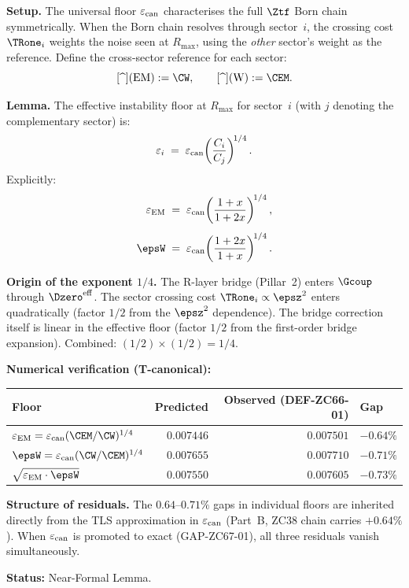\documentclass[12pt, a4paper]{article}
\renewcommand{\epsEM}{\varepsilon_{\rm EM}}
\renewcommand{\epscan}{\varepsilon_{\rm can}}
\begin{document}
\begin{formalbox}[title={LEM-ZC67-01: Sector Weight Projection ---
  $\varepsilon_i = \varepsilon_{\rm can}(C_i/C_j)^{1/4}$,\,$j\neq i$
  (Near-Formal)}]

\textbf{Setup.}
The universal floor $\epscan$ characterises the full $\Ztf$ Born
chain symmetrically.
When the Born chain resolves through sector~$i$, the crossing
cost $\TRone_i$ weights the noise seen at $R_{\max}$,
using the \emph{other} sector's weight as the reference.
Define the cross-sector reference for each sector:
\begin{equation}
  \Cref^{(\rm EM)} := \CW,
  \qquad
  \Cref^{(\rm W)}  := \CEM.
  \label{eq:Cref}
\end{equation}

\textbf{Lemma.}
The effective instability floor at $R_{\max}$ for sector~$i$
(with $j$ denoting the complementary sector) is:
\begin{equation}
  \varepsilon_i
  \;=\;
  \epscan\!\left(\frac{C_i}{C_j}\right)^{\!1/4}.
  \label{eq:proj}
\end{equation}
Explicitly:
\begin{align}
  \epsEM &\;=\; \epscan\!\left(\frac{1+x}{1+2x}\right)^{\!1/4},
  \label{eq:epsEM-pred}\\[4pt]
  \epsW  &\;=\; \epscan\!\left(\frac{1+2x}{1+x}\right)^{\!1/4}.
  \label{eq:epsW-pred}
\end{align}

\textbf{Origin of the exponent $1/4$.}
The R-layer bridge (Pillar~2) enters $\Gcoup$ through
$\Dzero^{\rm eff}$.
The sector crossing cost $\TRone_i \propto \epsz^{2}$ enters
quadratically (factor $1/2$ from the $\epsz^{2}$ dependence).
The bridge correction itself is linear in the effective floor
(factor $1/2$ from the first-order bridge expansion).
Combined: $(1/2)\times(1/2) = 1/4$.

\textbf{Numerical verification (T-canonical):}
\begin{center}
\renewcommand{\arraystretch}{1.25}
\begin{tabular}{@{}lrrl@{}}
\toprule
Floor & Predicted & Observed (DEF-ZC66-01) & Gap \\
\midrule
$\epsEM = \epscan(\CEM/\CW)^{1/4}$ & $0.007446$ & $0.007501$ & $-0.64\%$ \\
$\epsW  = \epscan(\CW/\CEM)^{1/4}$ & $0.007655$ & $0.007710$ & $-0.71\%$ \\
$\sqrt{\epsEM\cdot\epsW}$           & $0.007550$ & $0.007605$ & $-0.73\%$ \\
\bottomrule
\end{tabular}
\end{center}

\textbf{Structure of residuals.}
The $0.64$--$0.71\%$ gaps in individual floors are inherited
directly from the TLS approximation in $\epscan$ (Part~B,
ZC38 chain carries $+0.64\%$).
When $\epscan$ is promoted to exact (GAP-ZC67-01),
all three residuals vanish simultaneously.

\textbf{Status:} Near-Formal Lemma.
\end{formalbox}
\end{document}
